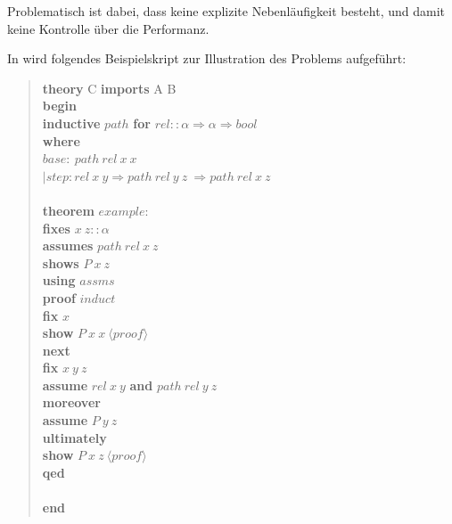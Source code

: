 Problematisch ist dabei, dass keine explizite Nebenläufigkeit besteht, und damit keine Kontrolle über die Performanz.

\clearpage

In \cite{parproof} wird folgendes Beispielskript zur Illustration des Problems aufgeführt:

\begin{quote}
\textbf{theory} C \textbf{imports} A B\\
\textbf{begin}\\
\textbf{inductive} $path$ \textbf{for} $rel :: \alpha \Rightarrow \alpha \Rightarrow bool$\\
\textbf{where}\\
\hspace*{7 mm}$base:\ path\ rel\ x\ x$\\
$|$\hspace*{6 mm}$step: rel\ x\ y \Longrightarrow path\ rel\ y\ z\ \Longrightarrow path\ rel\ x\ z$\\
\\
\textbf{theorem} $example:$\\
\hspace*{7 mm}\textbf{ﬁxes} $x\ z :: \alpha$\\
\hspace*{7 mm}\textbf{assumes} $path\ rel\ x\ z$\\
\hspace*{7 mm}\textbf{shows} $P\ x\ z$\\
\textbf{using} $assms$\\
\textbf{proof} $induct$\\
\hspace*{7 mm}\textbf{ﬁx} $x$\\
\hspace*{7 mm}\textbf{show} $P\ x\ x\ \langle proof\rangle$\\
\textbf{next}\\
\hspace*{7 mm}\textbf{ﬁx} $x\ y\ z$\\
\hspace*{7 mm}\textbf{assume} $rel\ x\ y$ \textbf{and} $path\ rel\ y\ z$\\
\hspace*{7 mm}\textbf{moreover}\\
\hspace*{7 mm}\textbf{assume} $P\ y\ z$\\
\hspace*{7 mm}\textbf{ultimately}\\
\hspace*{7 mm}\textbf{show} $P\ x\ z\ \langle proof\rangle$\\
\textbf{qed}\\
\\
\textbf{end}
\end{quote}

